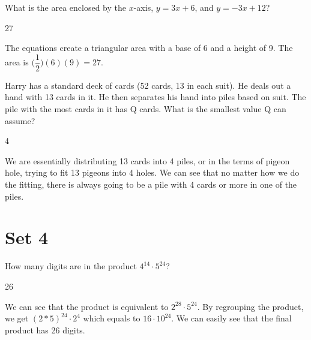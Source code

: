 \documentclass[11pt]{article}
\begin{document}
\begin{problem}%
What is the area enclosed by the $x$-axis, $y=3x+6$, and $y=-3x+12$?
\end{problem}

\begin{answer}
27
\end{answer}
 
\begin{solution}
The equations create a triangular area with a base of 6 and a height of 9. The area is $\bigg(\dfrac{1}{2}\bigg)(6)(9) = 27$.
\end{solution}


\begin{problem}
Harry has a standard deck of cards (52 cards, 13 in each suit). He deals out a hand with 13 cards in it. He then separates his hand into piles based on suit. The pile with the most cards in it has Q cards. What is the smallest value Q can assume?
\end{problem}

\begin{answer}
4
\end{answer}

\begin{solution} %
We are essentially distributing 13 cards into 4 piles, or in the terms of pigeon hole, trying to fit 13 pigeons into 4 holes. We can see that no matter how we do the fitting, there is always going to be a pile with 4 cards or more in one of the piles. 
\end{solution}

\newpage

\section*{Set 4}

\begin{problem}
How many digits are in the product $4^{14} \cdot 5^{24}$?
\end{problem}

\begin{answer}
26
\end{answer}

\begin{solution}
We can see that the product is equivalent to $2^{28} \cdot 5^{24}$. By regrouping the product, we get $(2*5)^{24} \cdot 2^{4}$ which equals to $16 \cdot 10^{24}$. We can easily see that the final product has 26 digits. 
\end{solution}
\end{document}
